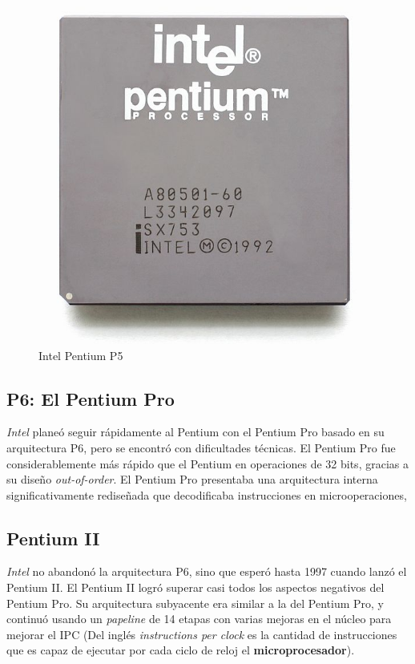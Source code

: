 \begin{figure}[htb]
	\centering
	\includegraphics[scale = 0.15]{Graphics/Intel_Pentium_P5.jpg}
	\caption{Intel Pentium P5}
	\label{fig:22}
\end{figure}

\subsection{P6: El Pentium Pro}
\emph{Intel} planeó seguir rápidamente al Pentium con el Pentium Pro basado en su arquitectura P6, pero se encontró con dificultades técnicas. El Pentium Pro fue considerablemente 
más rápido que el Pentium en operaciones de 32 bits, gracias a su diseño \emph{out-of-order}.  El Pentium Pro presentaba una arquitectura interna significativamente rediseñada 
que decodificaba instrucciones en microoperaciones,

\subsection{Pentium II}
\emph{Intel} no abandonó la arquitectura P6, sino que esperó hasta 1997 cuando lanzó el Pentium II. El Pentium II logró superar casi todos los aspectos negativos del Pentium Pro. 
Su arquitectura subyacente era similar a la del Pentium Pro, y continuó usando un \emph{papeline} de 14 etapas con varias mejoras en el núcleo para mejorar el IPC
(Del inglés \emph{instructions per clock} es la cantidad de instrucciones que es capaz de ejecutar por cada ciclo de reloj el \textbf{microprocesador}).

